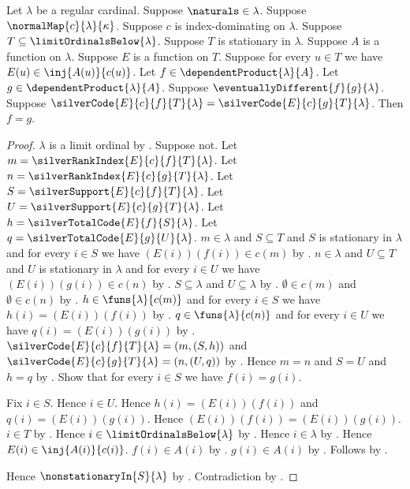 \begin{theorem}\label{silver_equal_codes_imply_equal_functions}
    Let $\lambda$ be a regular cardinal.
    Suppose $\naturals\in\lambda$.
    Suppose $\normalMap{c}{\lambda}{\kappa}$.
    Suppose $c$ is index-dominating on $\lambda$.
    Suppose $T\subseteq\limitOrdinalsBelow{\lambda}$.
    Suppose $T$ is stationary in $\lambda$.
    Suppose $A$ is a function on $\lambda$.
    Suppose $E$ is a function on $T$.
    Suppose for every $u\in T$ we have
        $E(u)\in\inj{A(u)}{c(u)}$.
    Let $f\in\dependentProduct{\lambda}{A}$.
    Let $g\in\dependentProduct{\lambda}{A}$.
    Suppose $\eventuallyDifferent{f}{g}{\lambda}$.
    Suppose $\silverCode{E}{c}{f}{T}{\lambda}
        =\silverCode{E}{c}{g}{T}{\lambda}$.
    Then $f=g$.
\end{theorem}
\begin{proof}
    $\lambda$ is a limit ordinal
        by .
    Suppose not.
    Let $m=\silverRankIndex{E}{c}{f}{T}{\lambda}$.
    Let $n=\silverRankIndex{E}{c}{g}{T}{\lambda}$.
    Let $S=\silverSupport{E}{c}{f}{T}{\lambda}$.
    Let $U=\silverSupport{E}{c}{g}{T}{\lambda}$.
    Let $h=\silverTotalCode{E}{f}{S}{\lambda}$.
    Let $q=\silverTotalCode{E}{g}{U}{\lambda}$.
    $m\in\lambda$ and $S\subseteq T$ and
        $S$ is stationary in $\lambda$ and
        for every $i\in S$ we have $(E(i))(f(i))\in c(m)$
        by .
    $n\in\lambda$ and $U\subseteq T$ and
        $U$ is stationary in $\lambda$ and
        for every $i\in U$ we have $(E(i))(g(i))\in c(n)$
        by .
    $S\subseteq\lambda$ and $U\subseteq\lambda$
        by .
    $\emptyset\in c(m)$ and $\emptyset\in c(n)$
        by .
    $h\in\funs{\lambda}{c(m)}$ and
        for every $i\in S$ we have $h(i)=(E(i))(f(i))$
        by .
    $q\in\funs{\lambda}{c(n)}$ and
        for every $i\in U$ we have $q(i)=(E(i))(g(i))$
        by .
    $\silverCode{E}{c}{f}{T}{\lambda}=(m,(S,h))$ and
        $\silverCode{E}{c}{g}{T}{\lambda}=(n,(U,q))$
        by .
    Hence $m=n$ and $S=U$ and $h=q$
        by .
    Show that for every $i\in S$ we have $f(i)=g(i)$.
    \begin{subproof}
        Fix $i\in S$.
        Hence $i\in U$.
        Hence $h(i)=(E(i))(f(i))$ and
            $q(i)=(E(i))(g(i))$.
        Hence $(E(i))(f(i))=(E(i))(g(i))$.
        $i\in T$ by .
        Hence $i\in\limitOrdinalsBelow{\lambda}$ by .
        Hence $i\in\lambda$ by .
        Hence $E(i)\in\inj{A(i)}{c(i)}$.
        $f(i)\in A(i)$ by .
        $g(i)\in A(i)$ by .
        Follows by .
    \end{subproof}
    Hence $\nonstationaryIn{S}{\lambda}$
        by .
    Contradiction by .
\end{proof}

